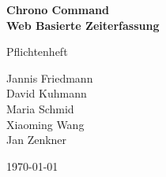 \documentclass[hidelinks]{scrartcl}
\begin{document}
	\setlength{\parindent}{0pt}

	\begin{titlepage}

		\begin{center}
			\huge \bfseries Chrono Command \\
			\large  Web Basierte Zeiterfassung
		\end{center}

		\begin{center}
				\large Pflichtenheft \\
		\end{center}

		\begin{center}
			Jannis Friedmann \\
			David Kuhmann \\
			Maria Schmid \\
			Xiaoming Wang \\
			Jan Zenkner \\

		\end{center}

		\begin{center}
			\large \today
		\end{center}
	
		\vfill
	\end{titlepage}
	\thispagestyle{empty}


	\clearpage
	\pagestyle{empty}
	\tableofcontents

	\clearpage
	\pagestyle{plain}
	\setcounter{page}{1}

	
	
	
	
	
	
	
	
	
	
	
	
\end{document}
